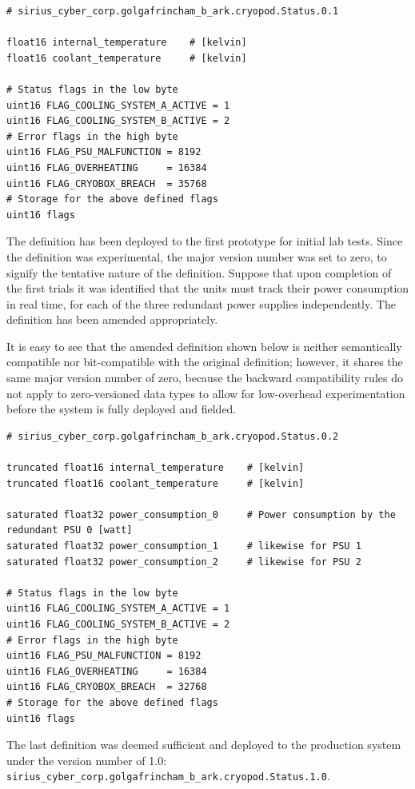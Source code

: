 \begin{verbatim}
# sirius_cyber_corp.golgafrincham_b_ark.cryopod.Status.0.1

float16 internal_temperature    # [kelvin]
float16 coolant_temperature     # [kelvin]

# Status flags in the low byte
uint16 FLAG_COOLING_SYSTEM_A_ACTIVE = 1
uint16 FLAG_COOLING_SYSTEM_B_ACTIVE = 2
# Error flags in the high byte
uint16 FLAG_PSU_MALFUNCTION = 8192
uint16 FLAG_OVERHEATING     = 16384
uint16 FLAG_CRYOBOX_BREACH  = 35768
# Storage for the above defined flags
uint16 flags
\end{verbatim}

The definition has been deployed to the first prototype for initial lab tests.
Since the definition was experimental, the major version number was set to zero, to signify the
tentative nature of the definition.
Suppose that upon completion of the first trials it was identified that the units must track their power consumption
in real time, for each of the three redundant power supplies independently.
The definition has been amended appropriately.

It is easy to see that the amended definition shown below is neither semantically compatible nor bit-compatible
with the original definition; however, it shares the same major version number of zero, because the backward
compatibility rules do not apply to zero-versioned data types to allow for low-overhead experimentation
before the system is fully deployed and fielded.

\begin{verbatim}
# sirius_cyber_corp.golgafrincham_b_ark.cryopod.Status.0.2

truncated float16 internal_temperature    # [kelvin]
truncated float16 coolant_temperature     # [kelvin]

saturated float32 power_consumption_0     # Power consumption by the redundant PSU 0 [watt]
saturated float32 power_consumption_1     # likewise for PSU 1
saturated float32 power_consumption_2     # likewise for PSU 2

# Status flags in the low byte
uint16 FLAG_COOLING_SYSTEM_A_ACTIVE = 1
uint16 FLAG_COOLING_SYSTEM_B_ACTIVE = 2
# Error flags in the high byte
uint16 FLAG_PSU_MALFUNCTION = 8192
uint16 FLAG_OVERHEATING     = 16384
uint16 FLAG_CRYOBOX_BREACH  = 32768
# Storage for the above defined flags
uint16 flags
\end{verbatim}

The last definition was deemed sufficient and deployed to the production system
under the version number of 1.0: \verb|sirius_cyber_corp.golgafrincham_b_ark.cryopod.Status.1.0|.

